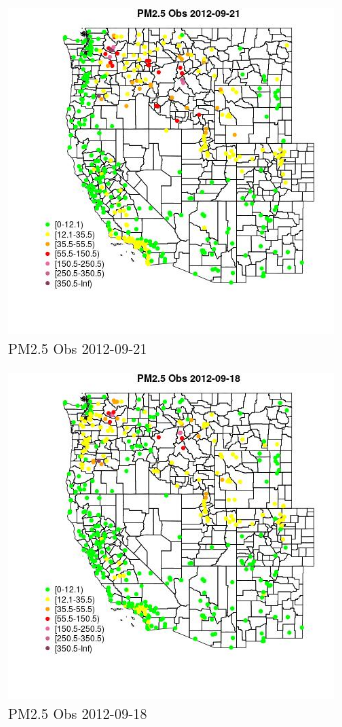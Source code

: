 \begin{figure} 
\centering  
\includegraphics[width=0.77\textwidth]{Code_Outputs/Report_ML_input_PM25_Step4_part_e_de_duplicated_aves_compiled_2019-05-14wNAs_MapObsPM25_Obs2012-09-21.jpg} 
\caption{\label{fig:Report_ML_input_PM25_Step4_part_e_de_duplicated_aves_compiled_2019-05-14wNAsMapObsPM25_Obs2012-09-21}PM2.5 Obs 2012-09-21} 
\end{figure} 
 

\begin{figure} 
\centering  
\includegraphics[width=0.77\textwidth]{Code_Outputs/Report_ML_input_PM25_Step4_part_e_de_duplicated_aves_compiled_2019-05-14wNAs_MapObsPM25_Obs2012-09-18.jpg} 
\caption{\label{fig:Report_ML_input_PM25_Step4_part_e_de_duplicated_aves_compiled_2019-05-14wNAsMapObsPM25_Obs2012-09-18}PM2.5 Obs 2012-09-18} 
\end{figure} 
 

